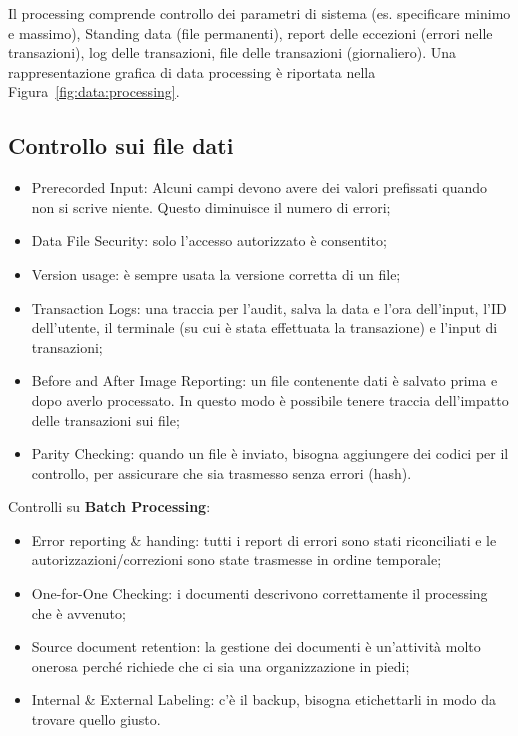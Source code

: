 Il processing comprende controllo dei parametri di sistema (es. specificare
minimo e massimo), Standing data (file permanenti), report delle eccezioni
(errori nelle transazioni), log delle transazioni, file delle transazioni
(giornaliero). Una rappresentazione grafica di data processing è riportata
nella Figura~\ref{fig:data:processing}.


\subsection{Controllo sui file dati}
\begin{itemize}
\item Prerecorded Input: Alcuni campi devono avere dei valori prefissati
quando non si scrive niente. Questo diminuisce il numero di errori;

\item Data File Security: solo l'accesso autorizzato è consentito;
\item Version usage: è sempre usata la versione corretta di un file;
\item Transaction Logs: una traccia per l'audit, salva la data e l'ora
dell'input, l'ID dell'utente, il terminale (su cui è stata effettuata la
transazione) e l'input di transazioni;
\item Before and After Image Reporting: un file contenente dati è salvato
prima e dopo averlo processato. In questo modo è possibile tenere traccia
dell'impatto delle transazioni sui file;
\item Parity Checking: quando un file è inviato, bisogna aggiungere dei codici
per il controllo, per assicurare che sia trasmesso senza errori (hash).
\end{itemize}

Controlli su \textbf{Batch Processing}:
\begin{itemize}
\item
Error reporting \& handing: tutti i report di errori sono stati riconciliati
e le autorizzazioni/correzioni sono state trasmesse in ordine temporale;
\item
One-for-One Checking: i documenti descrivono correttamente il processing
che è avvenuto;
\item
Source document retention: la gestione dei documenti è un'attività molto
onerosa perché richiede che ci sia una organizzazione in piedi;
\item
Internal \& External Labeling: c'è il backup, bisogna etichettarli in
modo da trovare quello giusto.
\end{itemize}





